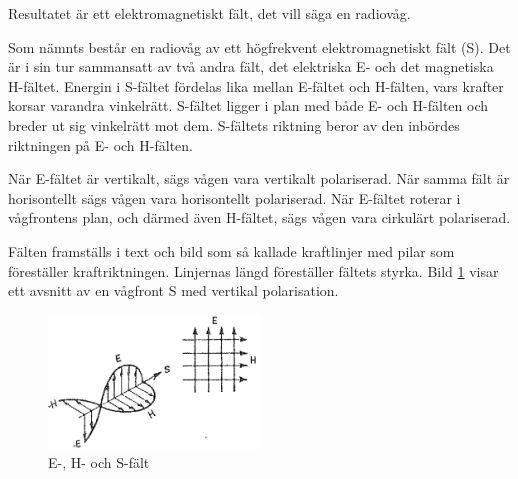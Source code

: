 Resultatet är ett elektromagnetiskt fält, det vill säga en radiovåg.

Som nämnts består en radiovåg av ett högfrekvent elektromagnetiskt fält (S).
Det är i sin tur sammansatt av två andra fält, det elektriska E-
och det magnetiska H-fältet.
Energin i S-fältet fördelas lika mellan E-fältet och H-fälten,
vars krafter korsar varandra vinkelrätt.
S-fältet ligger i plan med både E- och H-fälten och breder ut sig vinkelrätt
mot dem.
S-fältets riktning beror av den inbördes riktningen på E- och H-fälten.

När E-fältet är vertikalt, sägs vågen vara vertikalt polariserad.
När samma fält är horisontellt sägs vågen vara horisontellt polariserad.
När E-fältet roterar i vågfrontens plan, och därmed även H-fältet, sägs vågen
vara cirkulärt polariserad.

Fälten framställs i text och bild som så kallade kraftlinjer med pilar som
föreställer kraftriktningen.
Linjernas längd föreställer fältets styrka.
Bild \ref{fig:BildII7-06} visar ett avsnitt av en vågfront S med vertikal
polarisation.

\begin{figure}
\includegraphics[width=0.5\textwidth]{images/cropped_pdfs/bild_2_7-06.pdf}
\caption{E-, H- och S-fält}
\label{fig:BildII7-06}
\end{figure}

